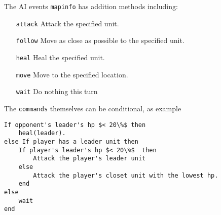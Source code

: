 The AI events \texttt{mapinfo} has addition methods including:
\begin{itemize}
	\item[\texttt{attack}]  Attack the specified unit.
	\item[\texttt{follow}]  Move as close as possible to the specified unit.
	\item[\texttt{heal}]    Heal the specified unit.
	\item[\texttt{move}]    Move to the specified location.
	\item[\texttt{wait}]    Do nothing this turn
\end{itemize}   

The \texttt{commands} themselves can be conditional, as example 
\begin{lstlisting}[caption=Conditional AI Event ]
If opponent's leader's hp $< 20\%$ then
	heal(leader).
else If player has a leader unit then
	If player's leader's hp $< 20\%$  then
	 	Attack the player's leader unit
	else
		Attack the player's closet unit with the lowest hp.
	end
else
	wait
end	
\end{lstlisting}

